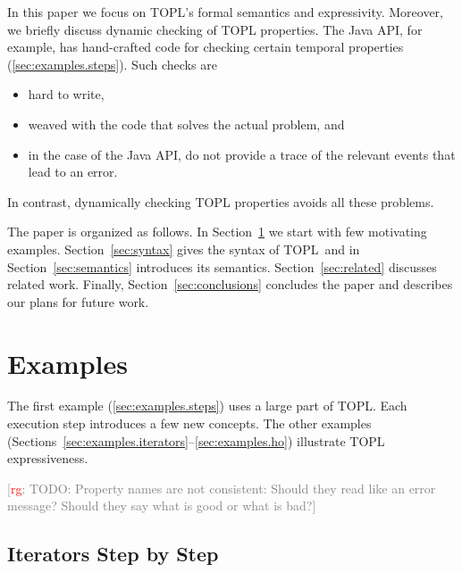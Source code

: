 \documentclass[preprint]{sigplanconf} %
\newcommand{\TPL}{TOPL}
\newcommand{\note}[2]{\textcolor{gray}{[\textcolor{red}{#1}: #2]}}
\newcommand{\rg}[1]{\note{rg}{#1}}
\theoremstyle{definition}
\theoremstyle{remark}
\begin{document}
In this paper we focus on TOPL's formal semantics and expressivity.
Moreover, we briefly discuss dynamic checking of TOPL properties.
The Java API, for example, has hand-crafted code for checking certain temporal properties (\autoref{sec:examples.steps}).
Such checks are
\begin{itemize}
\item hard to write,
\item weaved with the code that solves the actual problem, and
\item in the case of the Java API, do not provide a trace of the relevant events that lead to an error.
\end{itemize}
In contrast, dynamically checking TOPL properties avoids all these problems.

The paper is organized as follows. In Section~\ref{sec:examples} we start with few motivating examples.
Section~\ref{sec:syntax} gives the syntax of \TPL \ and in Section~\ref{sec:semantics} introduces its semantics.
Section~\ref{sec:related} discusses related work.
Finally, Section~\ref{sec:conclusions} concludes the paper and describes our plans for future work.

\section{Examples} \label{sec:examples} %

The first example (\autoref{sec:examples.steps}) uses a large part of \TPL\null.
Each execution step introduces a few new concepts.
The other examples (Sections~\ref*{sec:examples.iterators}--\ref*{sec:examples.ho}) illustrate TOPL expressiveness.

\rg{TODO: Property names are not consistent:
Should they read like an error message?
Should they say what is good or what is bad?}

\subsection{Iterators Step by Step} \label{sec:examples.steps} %
\end{document}
